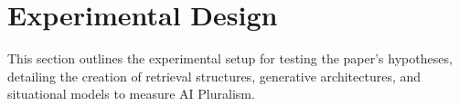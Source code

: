 \section{Experimental Design}
This section outlines the experimental setup for testing the paper's hypotheses, detailing the creation of retrieval structures, generative architectures, and situational models to measure AI Pluralism.
